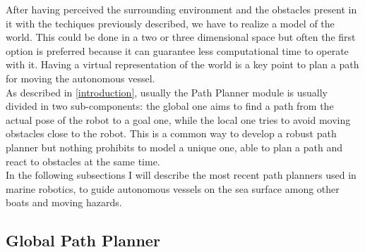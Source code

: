 \documentclass[12pt]{article}
\begin{document}
      After having perceived the surrounding environment and the obstacles present in it with the techiques previously described, we have to realize a model of the world. This could be done in a two or three dimensional space but often the first option is preferred because it can guarantee less computational time to operate with it. Having a virtual representation of the world is a key point to plan a path for moving the autonomous vessel.\\
      As described in \ref{introduction}, usually the Path Planner module is usually divided in two sub-components: the global one aims to find a path from the actual pose of the robot to a goal one, while the local one tries to avoid moving obstacles close to the robot. This is a common way to develop a robust path planner but nothing prohibits to model a unique one, able to plan a path and react to obstacles at the same time.\\
      \indent In the following subsections I will describe the most recent path planners used in marine robotics, to guide autonomous vessels on the sea surface among other boats and moving hazards.

        \subsection{Global Path Planner} \label{gpp}
\end{document}
